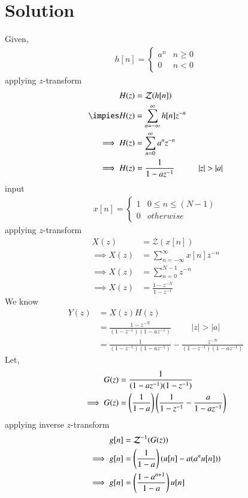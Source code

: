 \documentclass[journal,12pt,twocolumn]{IEEEtran}
\begin{document}
\section{Solution}
Given,
\begin{align}
    h[n] = \begin{cases} 
                a^{n} & n\geq 0\\
                0 & n<0
            \end{cases}
\end{align}
applying $z$-transform
\begin{align}
    H(z) &= \mathcal{Z}(h[n])\\
    \impies H(z) &= \sum_{n=-\infty}^{\infty}h[n]z^{-n}\\
    \implies H(z) &= \sum_{n=0}^{\infty}a^n z^{-n}\\
    \implies H(z) &= \frac{1}{1-az^{-1}}\hspace{1cm}|z|>|a|
\end{align}
input
\begin{align}
    x[n] = \begin{cases} 
                1 & 0\leq n\leq (N-1)\\
                0 & otherwise
            \end{cases}
\end{align}
applying $z$-transform
\begin{align}
    X(z) &= \mathcal{Z}(x[n])\\
    \implies X(z) &= \sum_{n=-\infty}^{\infty}x[n]z^{-n}\\
    \implies X(z) &= \sum_{n=0}^{N-1}z^{-n}\\
    \implies X(z) &= \frac{1-z^{-N}}{1-z^{-1}}
\end{align}
We know 
\begin{align}
    Y(z) &= X(z)H(z)\\
    &= \frac{1-z^{-N}}{(1-z^{-1})(1-az^{-1})}\hspace{1cm} |z|>|a|\\
     &= \frac{1}{(1-z^{-1})(1-az^{-1})}-\frac{z^{-N}}{(1-z^{-1})(1-az^{-1})}    \label{a}
\end{align}
Let, 
\begin{align}
    G(z)&=\frac{1}{(1-az^{-1})(1-z^{-1})}  \label{b} \\
    \implies G(z)&=\left(\frac{1}{1-a}\right)\left(\frac{1}{1-z^{-1}}-\frac{a}{1-az^{-1}}\right)
\end{align}
applying inverse $z$-transform
\begin{align}
    g[n] &= \mathcal{Z}^{-1}(G(z))\\
    \implies g[n] &= \left(\frac{1}{1-a}\right)(u[n]-a(a^nu[n]))\\
    \implies g[n] &= \left(\frac{1-a^{n+1}}{1-a}\right)u[n] \label{c}
\end{align}
\end{document}
